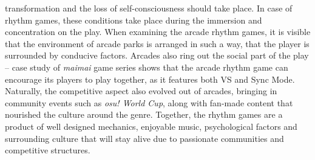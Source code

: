 transformation and the loss of self-consciousness should take place. In case of rhythm games, these conditions take place during the immersion and concentration on the play. When examining the arcade rhythm games, it is visible that the environment of arcade parks is arranged in such a way, that the player is surrounded by conducive factors. Arcades also ring out the social part of the play -- case study of \textit{maimai} game series shows that the arcade rhythm game can encourage its players to play together, as it features both VS and Sync Mode. Naturally, the competitive aspect also evolved out of arcades, bringing in community events such as \textit{osu! World Cup}, along with fan-made content that nourished the culture around the genre. Together, the rhythm games are a product of well designed mechanics, enjoyable music, psychological factors and surrounding culture that will stay alive due to passionate communities and competitive structures.